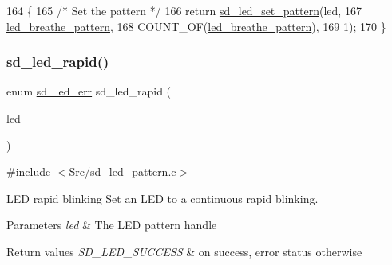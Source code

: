 \begin{DoxyCode}
164 \{
165     \textcolor{comment}{/* Set the pattern */}
166     \textcolor{keywordflow}{return} \mbox{\hyperlink{group___s_d___l_e_d___functions_ga5641c6ed41cf81ecbd2d61731a412667}{sd\_led\_set\_pattern}}(led,
167                 \mbox{\hyperlink{group___s_d___l_e_d___pattern___definitions_ga06b8eed3a2c65238cc510e61d75e8fde}{led\_breathe\_pattern}},
168                 COUNT\_OF(\mbox{\hyperlink{group___s_d___l_e_d___pattern___definitions_ga06b8eed3a2c65238cc510e61d75e8fde}{led\_breathe\_pattern}}),
169                 1);
170 \}
\end{DoxyCode}
\mbox{\label{group___s_d___l_e_d___pattern___functions_gaee88ed175473585caa9ae05d5b66f993}} 
\subsubsection{\texorpdfstring{sd\+\_\+led\+\_\+rapid()}{sd\_led\_rapid()}}
{\footnotesize\ttfamily enum \mbox{\hyperlink{group___s_d___l_e_d___types_ga4f347a1003b4089de88a7f0fc62c1071}{sd\+\_\+led\+\_\+err}} sd\+\_\+led\+\_\+rapid (\begin{DoxyParamCaption}\item[{struct \mbox{\hyperlink{structsd__led}{sd\+\_\+led}} $\ast$}]{led }\end{DoxyParamCaption})}



{\ttfamily \#include $<$\mbox{\hyperlink{sd__led__pattern_8c}{Src/sd\+\_\+led\+\_\+pattern.\+c}}$>$}



L\+ED rapid blinking Set an L\+ED to a continuous rapid blinking. 


\begin{DoxyParams}{Parameters}
{\em led} & The L\+ED pattern handle \\
\hline
\end{DoxyParams}

\begin{DoxyRetVals}{Return values}
{\em S\+D\+\_\+\+L\+E\+D\+\_\+\+S\+U\+C\+C\+E\+SS} & on success, error status otherwise \\
\hline
\end{DoxyRetVals}

